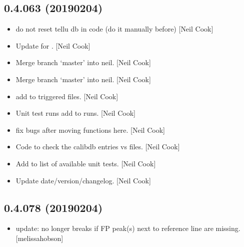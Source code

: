 \documentclass[a4paper,10pt,english]{report}
\begin{document}
\subsection{0.4.063 (2019\sphinxhyphen{}02\sphinxhyphen{}04)}
\label{\detokenize{misc/changelog:id215}}\begin{itemize}
\item {} 
 \sphinxhyphen{} do not reset tellu db in code (do it manually
before) {[}Neil Cook{]}

\item {} 
Update  for . {[}Neil Cook{]}

\item {} 
Merge branch ‘master’ into neil. {[}Neil Cook{]}

\item {} 
Merge branch ‘master’ into neil. {[}Neil Cook{]}

\item {} 
 \sphinxhyphen{} add  to triggered files. {[}Neil
Cook{]}

\item {} 
Unit test runs \sphinxhyphen{} add  to runs. {[}Neil Cook{]}

\item {} 
 \sphinxhyphen{} fix bugs after moving functions here. {[}Neil Cook{]}

\item {} 
Code to check the calibdb entries vs files. {[}Neil Cook{]}

\item {} 
Add  to list of available unit tests. {[}Neil Cook{]}

\item {} 
Update date/version/changelog. {[}Neil Cook{]}

\end{itemize}


\subsection{0.4.078 (2019\sphinxhyphen{}02\sphinxhyphen{}04)}
\label{\detokenize{misc/changelog:id216}}\begin{itemize}
\item {} 
 update: no longer breaks if FP peak(s) next to reference
line are missing. {[}melissa\sphinxhyphen{}hobson{]}

\end{itemize}
\end{document}
